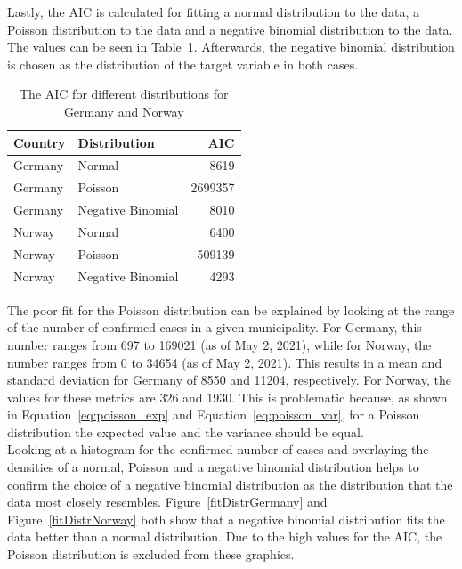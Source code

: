 Lastly, the AIC is calculated for fitting a normal distribution to the data, a Poisson distribution to the data and a negative binomial distribution to the data. The values can be seen in Table~\ref{aic}. Afterwards, the negative binomial distribution is chosen as the distribution of the target variable in both cases. \\
\begin{table}[H] 
\caption{The AIC for different distributions for Germany and Norway \label{aic}}
\begin{tabular}{l l r}
\toprule
\textbf{Country}	& \textbf{Distribution}	& \textbf{AIC} \\
\midrule
Germany & Normal & 8619 \\
Germany & Poisson & 2699357 \\
Germany & Negative Binomial & 8010 \\
Norway & Normal & 6400 \\
Norway & Poisson & 509139 \\
Norway & Negative Binomial & 4293 \\
\bottomrule
\end{tabular}
\end{table} 
The poor fit for the Poisson distribution can be explained by looking at the range of the number of confirmed cases in a given municipality. For Germany, this number ranges from 697 to 169021 (as of May 2, 2021), while for Norway, the number ranges from 0 to 34654 (as of May 2, 2021). This results in a mean and standard deviation for Germany of 8550 and 11204, respectively. For Norway, the values for these metrics are 326 and 1930. This is problematic because, as shown in Equation~\ref{eq:poisson_exp} and Equation~\ref{eq:poisson_var}, for a Poisson distribution the expected value and the variance should be equal. \\
Looking at a histogram for the confirmed number of cases and overlaying the densities of a normal, Poisson and a negative binomial distribution helps to confirm the choice of a negative binomial distribution as the distribution that the data most closely resembles. Figure~\ref{fitDistrGermany} and Figure~\ref{fitDistrNorway} both show that a negative binomial distribution fits the data better than a normal distribution. Due to the high values for the AIC, the Poisson distribution is excluded from these graphics.
